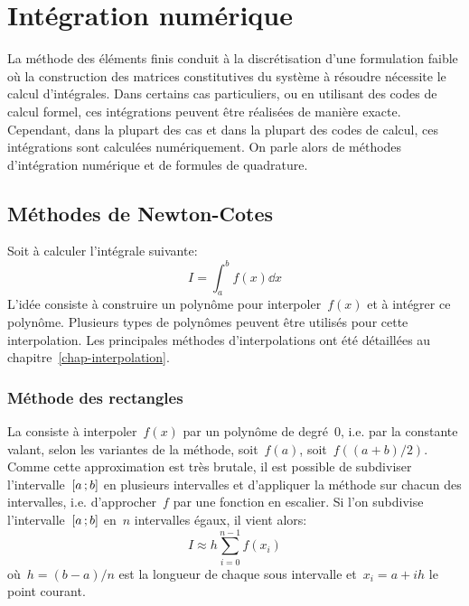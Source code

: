 \chapter{Intégration numérique}\label{chap-quadrature} 

\ifVersionDuDocEstVincent\vspace{10mm}\fi
La méthode des éléments finis conduit à la discrétisation d'une formulation faible où la construction des matrices constitutives du système à résoudre nécessite le calcul d'intégrales. Dans certains cas particuliers, ou en utilisant des codes de calcul formel, ces intégrations peuvent être réalisées de manière exacte. Cependant, dans la plupart des cas et dans la plupart des codes de calcul, ces intégrations sont calculées numériquement. On parle alors de méthodes d'intégration numérique et de formules de quadrature. 

\medskip
\section{Méthodes de Newton-Cotes}

Soit à calculer l'intégrale suivante: 
\begin{equation}
I=\int_a^b f(x)\dd x
\end{equation}
L'idée consiste à construire un polynôme pour interpoler~$f(x)$ et à intégrer ce polynôme. Plusieurs types de polynômes peuvent être utilisés pour cette interpolation. Les principales méthodes d'interpolations ont été détaillées au chapitre~\ref{chap-interpolation}. 

\medskip
\subsection*{Méthode des rectangles}

La  consiste à interpoler~$f(x)$ par un polynôme de degré~$0$, i.e. par la constante valant, selon les variantes de la méthode, soit~$f(a)$, soit~$f((a+b)/2)$. Comme cette approximation est très brutale, il est possible de subdiviser l'intervalle~$\mathopen{[}a\,;b\mathclose{]}$ en plusieurs intervalles et d'appliquer la méthode sur chacun des intervalles, i.e. d'approcher~$f$ par une fonction en escalier. Si l'on subdivise l'intervalle~$\mathopen{[}a\,;b\mathclose{]}$ en~$n$ intervalles égaux, il vient alors: 
\begin{equation}
I\approx h\sum_{i=0}^{n-1} f(x_i)
\end{equation}
où~$h=(b-a)/n$ est la longueur de chaque sous intervalle et~$x_i=a+ih$ le point courant. 

